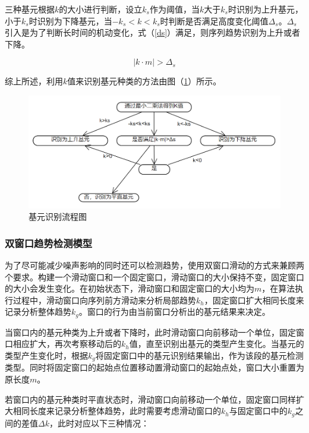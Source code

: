 \documentclass{my_paper}
\begin{document}
三种基元根据$k$的大小进行判断，设立$k_s$作为阈值，当$k$大于$k_s$时识别为上升基元，小于$k_s$时识别为下降基元，当$-k_s<k<k_s$时判断是否满足高度变化阈值$\Delta_s$。$\Delta_s$引入是为了判断长时间的机动变化，式（\ref{ds}）满足，则序列趋势识别为上升或者下降。

\begin{equation}
|k\cdot m|>\Delta_s
\label{ds}
\end{equation}

综上所述，利用$k$值来识别基元种类的方法由图（\ref{jyz}）所示。

\begin {figure}[h]
\centering %
\includegraphics[width=\textwidth]{jiyuanz.png}
\caption{基元识别流程图} %
\label{jyz}
\end {figure}

\subsubsection{双窗口趋势检测模型}
为了尽可能减少噪声影响的同时还可以检测趋势，使用双窗口滑动的方式来兼顾两个要求。构建一个滑动窗口和一个固定窗口，滑动窗口的大小保持不变，固定窗口的大小会发生变化。在初始状态下，滑动窗口和固定窗口的大小均为$m$，在算法执行过程中，滑动窗口向序列前方滑动来分析局部趋势$k_h$，固定窗口扩大相同长度来记录分析整体趋势$k_g$。窗口的行为由当前窗口分析出的基元结果来决定。

当窗口内的基元种类为上升或者下降时，此时滑动窗口向前移动一个单位，固定窗口相应扩大，再次考察移动后的$k_h$值，直至识别出基元的类型产生变化。当基元的类型产生变化时，根据$k_g$将固定窗口中的基元识别结果输出，作为该段的基元检测类型。同时将固定窗口的起始点位置移动置滑动窗口的起始点处，窗口大小重置为原长度$m$。

若窗口内的基元种类时平直状态时，滑动窗口向前移动一个单位，固定窗口同样扩大相同长度来记录分析整体趋势，此时需要考虑滑动窗口的$k_h$与固定窗口中的$k_g$之间的差值$\Delta k$，此时对应以下三种情况：
\end{document}
